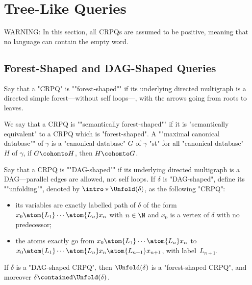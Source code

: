 \section{Tree-Like Queries}


\textcolor{Dark Ruby Red}{WARNING: In this section, all CRPQs are assumed to be positive, meaning
that no language can contain the empty word.}

\subsection{Forest-Shaped and DAG-Shaped Queries}

Say that a "CRPQ" is \AP""forest-shaped"" if its underlying directed multigraph 
is a directed simple forest---without self loops---, with the arrows going from roots to leaves.

We say that a CRPQ is \AP""semantically forest-shaped"" if it is
"semantically equivalent" to a CRPQ which is "forest-shaped".
A \AP""maximal canonical database"" of $\gamma$ is a "canonical database"
$G$ of $\gamma$ "st" for all "canonical database" $H$ of $\gamma$,
if $G \cohomto H$, then $H \cohomto G$.

Say that a CRPQ is \AP""DAG-shaped"" if its underlying directed multigraph
is a DAG---parallel edges are allowed, not self loops. If $\delta$ is "DAG-shaped",
define its \AP""unfolding"", denoted by \AP$\intro*\Unfold(\delta)$, as the following "CRPQ":
\begin{itemize}
	\item its variables are exactly labelled path of $\delta$
	of the form $x_0 \atom{L_1} \cdots \atom{L_n} x_n$ with $n\in \N$
	and $x_0$ is a vertex of $\delta$ with no predecessor;
	\item the atoms exactly go from $x_0 \atom{L_1} \cdots \atom{L_n} x_n$
	to $x_0 \atom{L_1} \cdots \atom{L_n} x_n \atom{L_{n+1}} x_{n+1}$,
	with label~$L_{n+1}$.
\end{itemize}

\begin{fact}
	\AP\label{fact:unfolding-is-forest}
	If $\delta$ is a "DAG-shaped CRPQ", then $\Unfold(\delta)$ is a "forest-shaped CRPQ",
	and moreover $\delta \contained \Unfold(\delta)$.
\end{fact}

